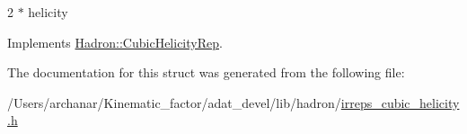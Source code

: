 2 $\ast$ helicity 

Implements \mbox{\hyperlink{structHadron_1_1CubicHelicityRep_af507aa56fc2747eacc8cb6c96db31ecc}{Hadron\+::\+Cubic\+Helicity\+Rep}}.



The documentation for this struct was generated from the following file\+:\begin{DoxyCompactItemize}
\item 
/\+Users/archanar/\+Kinematic\+\_\+factor/adat\+\_\+devel/lib/hadron/\mbox{\hyperlink{lib_2hadron_2irreps__cubic__helicity_8h}{irreps\+\_\+cubic\+\_\+helicity.\+h}}\end{DoxyCompactItemize}
